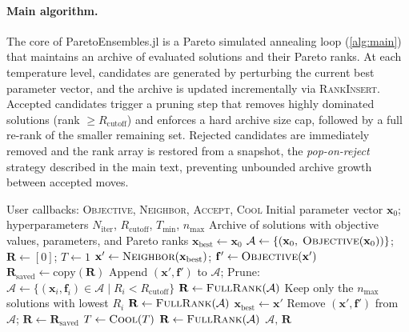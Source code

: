 \documentclass[preprint,review,12pt]{elsarticle}
\begin{document}
\paragraph{Main algorithm.}
The core of ParetoEnsembles.jl is a Pareto simulated annealing loop (\cref{alg:main}) that maintains an archive of evaluated solutions and their Pareto ranks.
At each temperature level, candidates are generated by perturbing the current best parameter vector, and the archive is updated incrementally via \textsc{RankInsert}.
Accepted candidates trigger a pruning step that removes highly dominated solutions (rank $\geq R_{\text{cutoff}}$) and enforces a hard archive size cap, followed by a full re-rank of the smaller remaining set.
Rejected candidates are immediately removed and the rank array is restored from a snapshot, the \emph{pop-on-reject} strategy described in the main text, preventing unbounded archive growth between accepted moves.

\begin{algorithm}[H]
\caption{\textsc{ParetoEnsembles}: Pareto simulated annealing with incremental ranking}\label{alg:main}
\begin{algorithmic}[1]
\Require User callbacks: \textsc{Objective}, \textsc{Neighbor}, \textsc{Accept}, \textsc{Cool}
\Require Initial parameter vector $\mathbf{x}_0$; hyperparameters $N_{\text{iter}}$, $R_{\text{cutoff}}$, $T_{\min}$, $n_{\max}$
\Ensure Archive of solutions with objective values, parameters, and Pareto ranks
\Statex
\State $\mathbf{x}_{\text{best}} \gets \mathbf{x}_0$
\State $\mathcal{A} \gets \{(\mathbf{x}_0,\; \textsc{Objective}(\mathbf{x}_0))\}$; \quad $\mathbf{R} \gets [0]$; \quad $T \gets 1$
\Statex
{}
    \State $\mathbf{x}' \gets \textsc{Neighbor}(\mathbf{x}_{\text{best}})$; \quad $\mathbf{f}' \gets \textsc{Objective}(\mathbf{x}')$
    \State $\mathbf{R}_{\text{saved}} \gets \text{copy}(\mathbf{R})$
    \State Append $(\mathbf{x}', \mathbf{f}')$ to $\mathcal{A}$; \quad {}
      \State Prune: $\mathcal{A} \gets \{(\mathbf{x}_i, \mathbf{f}_i) \in \mathcal{A} \mid R_i < R_{\text{cutoff}}\}$
      \State $\mathbf{R} \gets \textsc{FullRank}(\mathcal{A})$
        \State Keep only the $n_{\max}$ solutions with lowest $R_i$
        \State $\mathbf{R} \gets \textsc{FullRank}(\mathcal{A})$
      \EndIf
      \State $\mathbf{x}_{\text{best}} \gets \mathbf{x}'$
    \Else
      \State Remove $(\mathbf{x}', \mathbf{f}')$ from $\mathcal{A}$; \quad $\mathbf{R} \gets \mathbf{R}_{\text{saved}}$
    \EndIf
  \EndFor
  \State $T \gets \textsc{Cool}(T)$
\EndWhile
\State $\mathbf{R} \gets \textsc{FullRank}(\mathcal{A})$
\State \Return $\mathcal{A},\, \mathbf{R}$
\end{algorithmic}
\end{algorithm}
\end{document}
